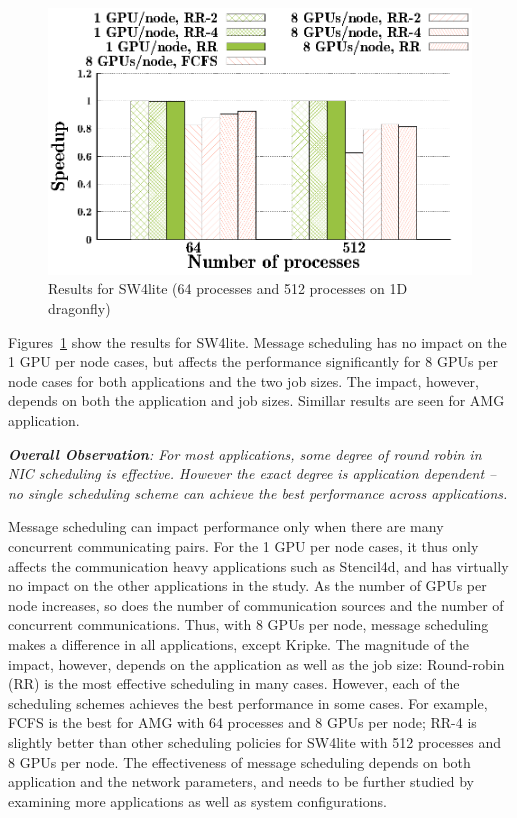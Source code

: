 \begin{figure}[t]
  \centering
  \includegraphics[width=0.8\columnwidth]{figure/plots/sched/dfly-sched-mapping-sw4lite.eps}
  \vspace{-0.5in}
  \caption{Results for SW4lite (64 processes and 512 processes on 1D dragonfly)}
  \label{fig:sw4lite_scheduling_dfly}
\end{figure}


Figures~\ref{fig:sw4lite_scheduling_dfly} show the
results for SW4lite. Message scheduling has no impact on the 1 GPU per node cases, but
affects the performance significantly for 8 GPUs per node cases for both applications and the two
job sizes. The impact, however, depends on both the application and job sizes.
Simillar results are seen for AMG application.

\vspace{1em}
\noindent
{\it \textbf{Overall Observation}:
For most applications, some degree of round robin in NIC scheduling is effective. However
    the exact degree is application dependent -- no single scheduling scheme can achieve the best
  performance across applications.}

Message scheduling can impact performance only when there are many concurrent
communicating pairs. For the 1 GPU per node cases, it thus only affects the
communication heavy applications such as Stencil4d, and has virtually no impact
on the other applications in the study. As the number of GPUs per node
increases, so does the  number of communication sources and the number of
concurrent communications. Thus, with 8 GPUs per node, message scheduling makes
a difference in all applications, except Kripke.  The magnitude of the impact,
however, depends on the application as well as the job size: Round-robin (RR) is
the most effective scheduling in many cases.  However, each of the scheduling
schemes achieves the best performance in some cases.
For example, FCFS is the best for AMG with 64 processes and 8 GPUs per node;
RR-4 is slightly better than other scheduling policies for SW4lite with 512
processes and 8 GPUs per node.  The effectiveness of message
scheduling depends on both application and the network parameters, and needs to
be further studied by examining more applications as well as system
configurations. 



